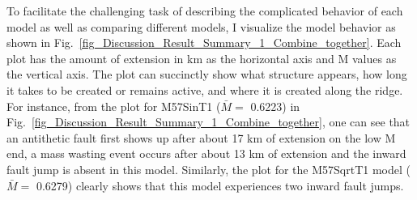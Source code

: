 
To facilitate the challenging task of describing the complicated behavior of each model as well as comparing different models, I visualize the model behavior as shown in Fig.~\hyperref[fig_Discussion_Result_Summary_1_Combine_together]{\ref{fig_Discussion_Result_Summary_1_Combine_together}}. Each plot has the amount of extension in km as the horizontal axis and M values as the vertical axis. The plot can succinctly show what structure appears, how long it takes to be created or remains active, and where it is created along the ridge. 
For instance, from the plot for M57SinT1 ($\bar{M} =$ 0.6223) in Fig.~\hyperref[fig_Discussion_Result_Summary_1_Combine_together]{\ref{fig_Discussion_Result_Summary_1_Combine_together}}, one can see that an antithetic fault first shows up after about 17 km of extension on the low M end, a mass wasting event occurs after about 13 km of extension and the inward fault jump is absent in this model. Similarly, the plot for the M57SqrtT1 model ($\bar{M} =$ 0.6279) clearly shows that this model experiences two inward fault jumps. %



